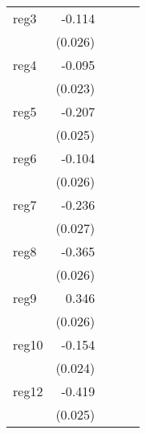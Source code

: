 {\begin{longtable}{l*{4}{D{.}{.}{-1}}}
\addlinespace
reg3        &      -0.114\sym{***}&                     &                     &                     \\
            &     (0.026)         &                     &                     &                     \\
\addlinespace
reg4        &      -0.095\sym{***}&                     &                     &                     \\
            &     (0.023)         &                     &                     &                     \\
\addlinespace
reg5        &      -0.207\sym{***}&                     &                     &                     \\
            &     (0.025)         &                     &                     &                     \\
\addlinespace
reg6        &      -0.104\sym{***}&                     &                     &                     \\
            &     (0.026)         &                     &                     &                     \\
\addlinespace
reg7        &      -0.236\sym{***}&                     &                     &                     \\
            &     (0.027)         &                     &                     &                     \\
\addlinespace
reg8        &      -0.365\sym{***}&                     &                     &                     \\
            &     (0.026)         &                     &                     &                     \\
\addlinespace
reg9        &       0.346\sym{***}&                     &                     &                     \\
            &     (0.026)         &                     &                     &                     \\
\addlinespace
reg10       &      -0.154\sym{***}&                     &                     &                     \\
            &     (0.024)         &                     &                     &                     \\
\addlinespace
reg12       &      -0.419\sym{***}&                     &                     &                     \\
            &     (0.025)         &                     &                     &                     \\

\end{longtable}}
